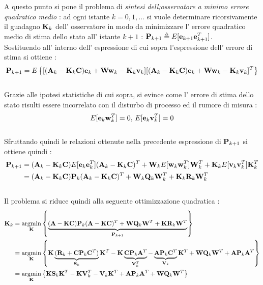 A questo punto si pone il problema di \textit{sintesi dell;osservatore a minimo errore quadratico medio} : ad ogni istante $k=0,1,...$ si vuole determinare ricorsivamente il guadagno $\mathbf{K}_k$ dell' osservatore in modo da minimizzare
l' errore quadratico medio di stima dello stato all' istante $k+1$ : $\mathbf{P}_{k+1} \triangleq E[\mathbf{e}_{k+1}\mathbf{e}^T_{k+1}]$.
\\
Sostituendo all' interno dell' espressione di cui sopra l'espressione dell' errore di stima si ottiene : \[\mathbf{P}_{k+1} = E\left\{[(\mathbf{A}_k-\mathbf{K}_k\mathbf{C})\mathbf{e}_k+\mathbf{W}\mathbf{w}_{k}-\mathbf{K}_k \mathbf{v}_{k}][(\mathbf{A}_k-\mathbf{K}_k\mathbf{C})\mathbf{e}_k+\mathbf{W}\mathbf{w}_{k}-\mathbf{K}_k \mathbf{v}_{k}]^T\right\}\]
\\
Grazie alle ipotesi statistiche di cui sopra, si evince come l' errore di stima dello stato risulti essere incorrelato con il disturbo di processo ed il rumore di misura : \[E[\mathbf{e}_k \mathbf{w}^T_k] = 0, \,	E[\mathbf{e}_k \mathbf{v}^T_k] = 0\]\\
Sfruttando quindi le relazioni ottenute nella precedente espressione di $\mathbf{P}_{k+1}$ si ottiene quindi :
\begin{align}
\mathbf{P}_{k+1} &= (\mathbf{A}_k-\mathbf{K}_k\mathbf{C})E[\mathbf{e}_k\mathbf{e}^T_k](\mathbf{A}_k-\mathbf{K}_k\mathbf{C})^T +\mathbf{W}_kE[\mathbf{w}_k\mathbf{w}^T_k]\mathbf{W}^T_k + \mathbf{K}_kE[\mathbf{v}_k\mathbf{v}^T_k]\mathbf{K}^T_k \nonumber \\
&= (\mathbf{A}_k-\mathbf{K}_k\mathbf{C})\mathbf{P}_{k}(\mathbf{A}_k-\mathbf{K}_k\mathbf{C})^T + \mathbf{W}_k\mathbf{Q}_k\mathbf{W}^T_k+\mathbf{K}_k\mathbf{R}_k\mathbf{W}^T_k\nonumber
\end{align}
\\
Il problema si riduce quindi alla seguente ottimizzazione quadratica : 
\begin{align}
\mathbf{K}_k &= \underset{\mathbf{K}}{\operatorname{argmin}} \left\{ \underbrace{(\mathbf{A}-\mathbf{K}\mathbf{C})\mathbf{P}_{k}(\mathbf{A}-\mathbf{K}\mathbf{C})^T + \mathbf{W}\mathbf{Q}_k\mathbf{W}^T+\mathbf{K}\mathbf{R}_k\mathbf{W}^T}_{\mathbf{P}_{k+1}} \right\}\nonumber \\
&= \underset{\mathbf{K}}{\operatorname{argmin}} \left\{ \mathbf{K}\underbrace{(\mathbf{R}_k+\mathbf{C}\mathbf{P}_k\mathbf{C}^T)}_{\mathbf{S}_k}\mathbf{K}^T-\mathbf{K}\underbrace{\mathbf{C}\mathbf{P}_k\mathbf{A}^T}_{\mathbf{V}^T_k}-\underbrace{\mathbf{A}\mathbf{P}_k\mathbf{C}^T}_{\mathbf{V}_k}\mathbf{K}^T+\mathbf{W}\mathbf{Q}_k\mathbf{W}^T+\mathbf{A}\mathbf{P}_k\mathbf{A}^T \right\}\nonumber \\
&=  \underset{\mathbf{K}}{\operatorname{argmin}} \left\{\mathbf{K}\mathbf{S}_k\mathbf{K}^T-\mathbf{K}\mathbf{V}^T_k-\mathbf{V}_k\mathbf{K}^T+\mathbf{A}\mathbf{P}_k\mathbf{A}^T+\mathbf{W}\mathbf{Q}_k\mathbf{W}^T\right\}\nonumber
\end{align}
